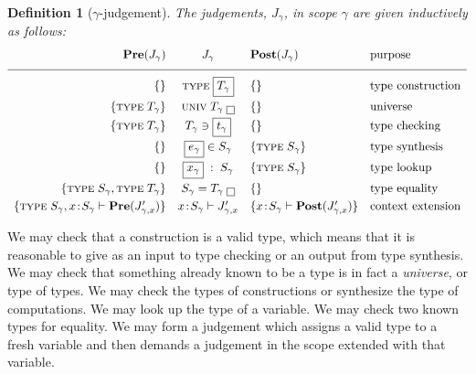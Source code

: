 \documentclass{jfp1}
\newtheorem{definition}[theorem]{Definition}
\begin{document}
\newcommand{\bx}[1]{\framebox{\ensuremath{#1}}}
\newcommand{\ty}[1]{\textsc{type}\;#1}
\newcommand{\univ}[1]{\textsc{univ}\;#1}
\newcommand{\chk}[2]{#1 \ni #2}
\newcommand{\syn}[2]{#1 \in #2}
\newcommand{\cxe}[2]{#1\!:\!#2\vdash}
\newcommand{\cxl}[2]{#1\;:\;#2}
\newcommand{\Pre}[1]{\textbf{Pre}(#1)}
\newcommand{\Post}[1]{\textbf{Post}(#1)}
\begin{definition}[$\gamma$-judgement]
  The judgements, $J_\gamma$, in scope $\gamma$ are given inductively as follows:
  \[\begin{array}{r@{\quad}c@{\quad}l@{\quad}l}
      \Pre{J_\gamma} & J_\gamma& \Post{J_\gamma} & \mbox{purpose} \\
      \hline
      \{\} &\ty{\bx{T_\gamma}}& \{\}  & \mbox{type construction}
                                        \smallskip\\
      \{\ty{T_\gamma}\} &\univ{T_\gamma}\;\bx{}& \{\}  & \mbox{universe}
                                        \smallskip\\
      \{\ty{T_\gamma}\} & \chk{T_\gamma}{\bx{t_\gamma}} &\{\}  & \mbox{type checking}
                                                                 \smallskip\\
      \{\}  & \syn{\bx{e_\gamma}}{S_\gamma} & \{\ty{S_\gamma}\} & \mbox{type synthesis}
                                                                  \smallskip\\
      \{\}  & \cxl{\bx{x_\gamma}}{S_\gamma} & \{\ty{S_\gamma}\} & \mbox{type lookup}
                                                             \smallskip\\
      \{\ty{S_\gamma},\ty{T_\gamma}\} & S_\gamma = T_\gamma\;\bx{} & \{\}  & \mbox{type equality}
                                                                             \smallskip\\
      \{\ty{S_\gamma},\cxe x{S_\gamma} \Pre{J'_{\gamma,x}}\} & \cxe x{S_\gamma} J'_{\gamma,x}
           & \{\cxe x{S_\gamma}\Post{J'_{\gamma,x}}\} & \mbox{context extension} 
  \end{array}\]
\end{definition}

We may check that a construction is a valid type, which means that it
is reasonable to give as an input to type checking or an output from
type synthesis. We may check that something already known to be a type is in fact
a \emph{universe}, or type of types. We may check the types of constructions or synthesize
the type of computations. We may look up the type of a variable. We may check two known types
for equality. We may form a judgement which assigns a valid type to a fresh variable and
then demands a judgement in the scope extended with that variable.
\end{document}

